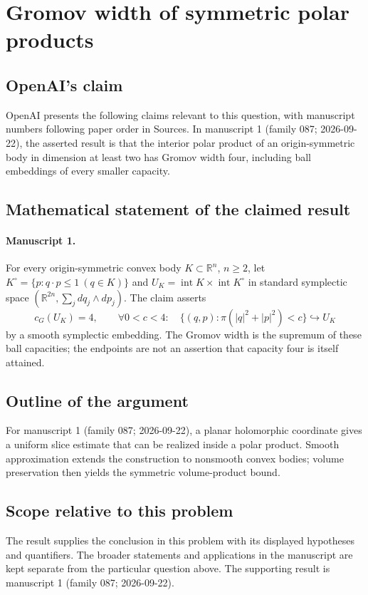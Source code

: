 \documentclass[11pt]{article}
\begin{document}
\section*{Gromov width of symmetric polar products}

\subsection{OpenAI's claim}
OpenAI presents the following claims relevant to this question, with manuscript numbers following paper order in Sources. In manuscript 1 (family 087; 2026-09-22), the asserted result is that the interior polar product of an origin-symmetric body in dimension at least two has Gromov width four, including ball embeddings of every smaller capacity.

\subsection{Mathematical statement of the claimed result}
\paragraph{Manuscript 1.}
For every origin-symmetric convex body $K\subset\mathbb R^n$, $n\ge2$, let $K^{\circ}=\{p:q\cdot p\le1\ (q\in K)\}$ and $U_K=\operatorname{int}K\times\operatorname{int}K^{\circ}$ in standard symplectic space $(\mathbb R^{2n},\sum_jdq_j\wedge dp_j)$. The claim asserts
\[
 c_G(U_K)=4,\qquad
 \forall0<c<4:\quad\{(q,p):\pi(|q|^2+|p|^2)<c\}\hookrightarrow U_K
\]
by a smooth symplectic embedding. The Gromov width is the supremum of these ball capacities; the endpoints are not an assertion that capacity four is itself attained.

\subsection{Outline of the argument}
For manuscript 1 (family 087; 2026-09-22), a planar holomorphic coordinate gives a uniform slice estimate that can be realized inside a polar product. Smooth approximation extends the construction to nonsmooth convex bodies; volume preservation then yields the symmetric volume-product bound.

\subsection{Scope relative to this problem}
The result supplies the conclusion in this problem with its displayed hypotheses and quantifiers. The broader statements and applications in the manuscript are kept separate from the particular question above. The supporting result is manuscript 1 (family 087; 2026-09-22).
\end{document}
